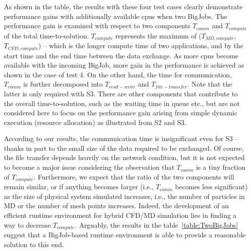 \documentclass[conference,final]{IEEEtran}
\newcommand{\jhanote}[1]{ {\textcolor{red} { ***Jha: #1 }}}
\newcommand{\jhanote}[1]{}
\begin{document}
As shown in the table, the results with these four test cases clearly
demonstrate performance gains with additionally available cpus when
two BigJobs.  The performance gain is examined with respect to two
components ${T_{comm}}$ and ${T_{compute}}$ of the total
time-to-solution.  %
${T_{compute}}$ represents the maximum of (${T _{MD,compute}}$,
${T_{CFD,compute}}$) -- which is the longer compute time of two
applications, and%
by the start time and the end time between the data exchange.  As more
cpus become available with the incoming BigJob, more gain in the
performance is achieved as shown in the case of test 4.  On the other
hand, the time for communication, ${T_{comm}}$ is further decomposed
into ${T_{read-write}}$ and ${T_{file-transfer}}$.  Note that the
latter is only required with S3.  There are other components that
contribute to the overall time-to-solution, such as the waiting time
in queue etc., but are not considered here to focus on the performance
gain arising from simple dynamic execution (resource allocation) as
illustrated from S2 and S3.


According to our results, the communication time is insignificant even
for S3 --  thanks in part to the small size of the data required to be
exchanged.  Of course, the file transfer depends heavily on the
network condition, but it is not expected to become a major issue
considering the observation that ${T_{comm}}$ is a tiny fraction of
${T_{compute}}$.  Furthermore, we expect that the ratio of the two
components will remain similar, or if anything becomes larger (i.e.,
${T_{comm}}$ becomes less significant) as the size of physical system
simulated increases, i.e., the number of particles in MD or the number
of mesh points increases.  Indeed, the development of an efficient
runtime environment for hybrid CFD/MD simulation lies in finding a way
to decrease ${T_{compute}}$.  Arguably, the results in the
table~\ref{table:TwoBigJobs} suggest that a BigJob-based runtime
environment is able to provide a reasonable solution to this end.
\end{document}
